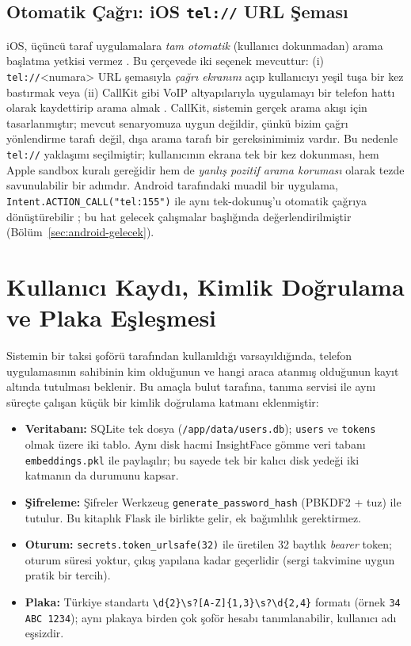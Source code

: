 \subsection{Otomatik Çağrı: iOS \texttt{tel://} URL Şeması}

iOS, üçüncü taraf uygulamalara \emph{tam otomatik} (kullanıcı dokunmadan)
arama başlatma yetkisi vermez \cite{apple_tel_url}. Bu çerçevede iki
seçenek mevcuttur: (i) \texttt{tel://}<numara> URL şemasıyla \emph{çağrı
ekranını} açıp kullanıcıyı yeşil tuşa bir kez bastırmak veya (ii)
CallKit gibi VoIP altyapılarıyla uygulamayı bir telefon hattı olarak
kaydettirip arama almak \cite{apple_callkit}. CallKit, sistemin gerçek
arama akışı için tasarlanmıştır; mevcut senaryomuza uygun değildir,
çünkü bizim çağrı yönlendirme tarafı değil, dışa arama tarafı bir
gereksinimimiz vardır. Bu nedenle \texttt{tel://} yaklaşımı seçilmiştir;
kullanıcının ekrana tek bir kez dokunması, hem Apple sandbox kuralı
gereğidir hem de \emph{yanlış pozitif arama koruması} olarak tezde
savunulabilir bir adımdır. Android tarafındaki muadil bir uygulama,
\texttt{Intent.ACTION\_CALL("tel:155")} ile aynı tek-dokunuş'u
otomatik çağrıya dönüştürebilir \cite{android2024telephony}; bu hat
gelecek çalışmalar başlığında değerlendirilmiştir
(Bölüm~\ref{sec:android-gelecek}).

\section{Kullanıcı Kaydı, Kimlik Doğrulama ve Plaka Eşleşmesi}
\label{sec:auth}

Sistemin bir taksi şoförü tarafından kullanıldığı varsayıldığında,
telefon uygulamasının sahibinin kim olduğunun ve hangi araca atanmış
olduğunun kayıt altında tutulması beklenir. Bu amaçla bulut tarafına,
tanıma servisi ile aynı süreçte çalışan küçük bir kimlik doğrulama
katmanı eklenmiştir:

\begin{itemize}
    \item \textbf{Veritabanı:} SQLite tek dosya
          (\texttt{/app/data/users.db}); \texttt{users} ve \texttt{tokens}
          olmak üzere iki tablo. Aynı disk hacmi InsightFace gömme veri
          tabanı \texttt{embeddings.pkl} ile paylaşılır; bu sayede tek
          bir kalıcı disk yedeği iki katmanın da durumunu kapsar.
    \item \textbf{Şifreleme:} Şifreler Werkzeug
          \texttt{generate\_password\_hash} (PBKDF2 + tuz) ile tutulur.
          Bu kitaplık Flask ile birlikte gelir, ek bağımlılık
          gerektirmez.
    \item \textbf{Oturum:} \texttt{secrets.token\_urlsafe(32)} ile üretilen
          32 baytlık \emph{bearer} token; oturum süresi yoktur, çıkış
          yapılana kadar geçerlidir (sergi takvimine uygun pratik bir
          tercih).
    \item \textbf{Plaka:} Türkiye standartı \texttt{\textbackslash d\{2\}\textbackslash s?[A-Z]\{1,3\}\textbackslash s?\textbackslash d\{2,4\}}
          formatı (örnek \texttt{34 ABC 1234}); aynı plakaya birden çok
          şoför hesabı tanımlanabilir, kullanıcı adı eşsizdir.
\end{itemize}

